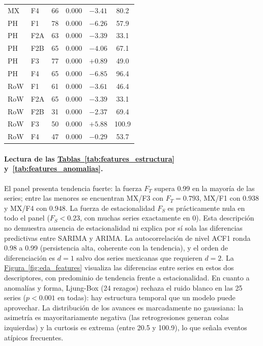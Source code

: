\documentclass[12pt,letterpaper]{report}
\begin{document}
\begin{table}[htbp]
\begin{tabular}{llcccc}
MX & F4 & 66 & 0.000 & $-3.41$ & 80.2 \\
PH & F1 & 78 & 0.000 & $-6.26$ & 57.9 \\
PH & F2A & 63 & 0.000 & $-3.39$ & 33.1 \\
PH & F2B & 65 & 0.000 & $-4.06$ & 67.1 \\
PH & F3 & 77 & 0.000 & $+0.89$ & 49.0 \\
PH & F4 & 65 & 0.000 & $-6.85$ & 96.4 \\
RoW & F1 & 61 & 0.000 & $-3.61$ & 46.4 \\
RoW & F2A & 65 & 0.000 & $-3.39$ & 33.1 \\
RoW & F2B & 31 & 0.000 & $-2.37$ & 69.4 \\
RoW & F3 & 50 & 0.000 & $+5.88$ & 100.9 \\
RoW & F4 & 47 & 0.000 & $-0.29$ & 53.7 \\
\bottomrule
\end{tabular}
\end{table}

\paragraph{Lectura de las \hyperref[tab:features_estructura]{Tablas~\ref*{tab:features_estructura}} y~\ref{tab:features_anomalias}.} El panel
presenta tendencia fuerte: la fuerza $F_T$ supera 0.99 en la mayoría de
las series; entre las menores se encuentran MX/F3 con $F_T=0.793$, MX/F1 con
$0.938$ y MX/F4 con $0.948$. La fuerza de
estacionalidad $F_S$ es prácticamente nula en todo el panel ($F_S < 0.23$, con muchas
series exactamente en 0). Esta descripción no demuestra ausencia de estacionalidad
ni explica por sí sola las diferencias predictivas entre SARIMA y ARIMA. La autocorrelación de
nivel ACF1 ronda 0.98 a 0.99 (persistencia alta, coherente con la tendencia), y el
orden de diferenciación es $d=1$ salvo dos series mexicanas que requieren $d=2$. La
\hyperref[fig:eda_features]{Figura~\ref*{fig:eda_features}} visualiza las diferencias entre series en estos dos
descriptores, con predominio de tendencia frente a estacionalidad. En cuanto a anomalías y
forma, Ljung-Box (24 rezagos) rechaza el ruido blanco en las 25 series ($p < 0.001$ en todas):
hay estructura temporal que un modelo puede aprovechar. La distribución de los avances es
marcadamente no gaussiana: la asimetría es mayoritariamente negativa (las retrogresiones
generan colas izquierdas) y la curtosis es extrema (entre 20.5 y 100.9), lo que señala eventos
atípicos frecuentes.
\end{document}
